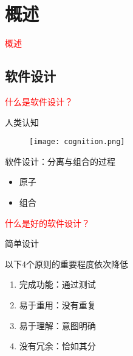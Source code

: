 \section{概述}
\label{sec:introduction}

\begin{frame}
  \begin{center}
    \Huge{\textcolor{red}{概述}}
  \end{center}
\end{frame}

\subsection{软件设计}

\begin{frame}
  \begin{center}
    \huge{\textcolor{red}{什么是软件设计？}}
  \end{center}
\end{frame}

\begin{frame}{人类认知}
  \begin{figure}
    \centering
    \texttt{[image: cognition.png]}
  \end{figure}
\end{frame}

\begin{frame}{软件设计：分离与组合的过程}
  \begin{itemize}
    \item \alert{原子}
    \item \alert{组合}
  \end{itemize}
\end{frame}

\begin{frame}
  \begin{center}
    \huge{\textcolor{red}{什么是好的软件设计？}}
  \end{center}
\end{frame}

\begin{frame}{简单设计}
  \begin{block}{以下4个原则的重要程度依次降低}
    \begin{enumerate}
    \item \alert{完成功能}：通过测试
    \item \alert{易于重用}：没有重复
    \item \alert{易于理解}：意图明确
    \item \alert{没有冗余}：恰如其分
    \end{enumerate}
  \end{block}
\end{frame}


